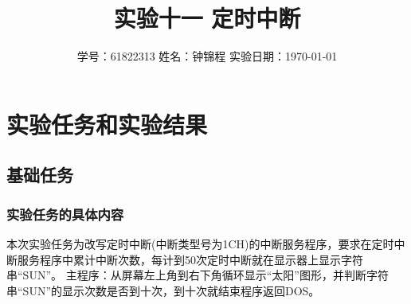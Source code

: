 \documentclass[12pt, a4paper, oneside]{ctexart}
\title{实验十一 \qquad  定时中断}
\author{学号：61822313 \qquad 姓名：钟锦程 \qquad 实验日期：\today}
\date{}
\begin{document}
\maketitle
\section{实验任务和实验结果}
\subsection{基础任务}
\subsubsection{实验任务的具体内容}
本次实验任务为改写定时中断(中断类型号为1CH)的中断服务程序，要求在定时中断服务程序中累计中断次数，每计到50次定时中断就在显示器上显示字符串“SUN”。
主程序：从屏幕左上角到右下角循环显示“太阳”图形，并判断字符串“SUN”的显示次数是否到十次，到十次就结束程序返回DOS。
\end{document}
